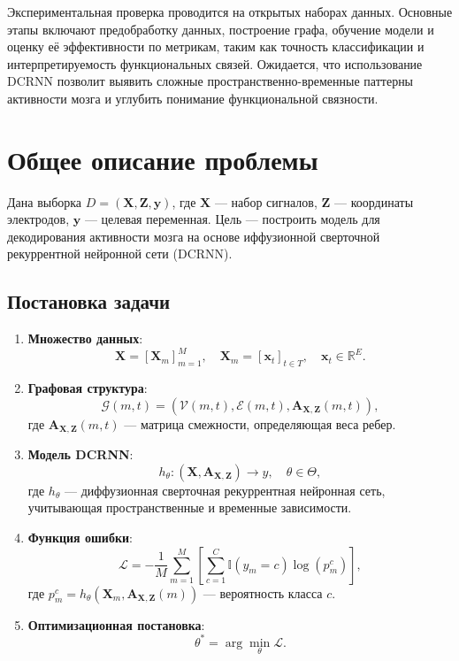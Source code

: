 \documentclass[12pt, twoside]{article}
\begin{document}
Экспериментальная проверка проводится на открытых наборах данных. Основные этапы включают предобработку данных, построение графа, обучение модели и оценку её эффективности по метрикам, таким как точность классификации и интерпретируемость функциональных связей. Ожидается, что использование DCRNN позволит выявить сложные пространственно-временные паттерны активности мозга и углубить понимание функциональной связности.


\newpage

\section{Общее описание проблемы}
Дана выборка \( D = (\mathbf{X}, \mathbf{Z}, \mathbf{y}) \), где \(\mathbf{X}\) — набор сигналов, \(\mathbf{Z}\) — координаты электродов, \(\mathbf{y}\) — целевая переменная. Цель — построить модель для декодирования активности мозга на основе иффузионной сверточной рекуррентной нейронной сети (DCRNN).

\subsection{Постановка задачи}

\begin{enumerate}
    \item \textbf{Множество данных}:  
    \[
    \mathbf{X} = [\mathbf{X}_m]_{m=1}^M, \quad \mathbf{X}_m = [\mathbf{x}_t]_{t \in T}, \quad \mathbf{x}_t \in \mathbb{R}^E.
    \]

    \item \textbf{Графовая структура}:  
    \[
    \mathcal{G}(m, t) = \left( \mathcal{V}(m, t), \mathcal{E}(m, t), \mathbf{A}_{\mathbf{X}, \mathbf{Z}}(m, t) \right),
    \]
    где \(\mathbf{A}_{\mathbf{X}, \mathbf{Z}}(m, t)\) — матрица смежности, определяющая веса ребер.

    \item \textbf{Модель DCRNN}:  
    \[
    h_\theta : (\mathbf{X}, \mathbf{A}_{\mathbf{X}, \mathbf{Z}}) \to y, \quad \theta \in \Theta,
    \]
    где \(h_\theta\) — диффузионная сверточная рекуррентная нейронная сеть, учитывающая пространственные и временные зависимости.

    \item \textbf{Функция ошибки}:  
    \[
    \mathcal{L} = -\frac{1}{M} \sum_{m=1}^M \left[ \sum_{c=1}^C \mathbb{I}(y_m = c) \log(p_m^c) \right],
    \]
    где \(p_m^c = h_\theta \left( \mathbf{X}_m, \mathbf{A}_{\mathbf{X}, \mathbf{Z}}(m) \right)\) — вероятность класса \(c\).

    \item \textbf{Оптимизационная постановка}:  
    \[
    \theta^* = \arg\min_{\theta} \mathcal{L}.
    \]
\end{enumerate}
\end{document}
